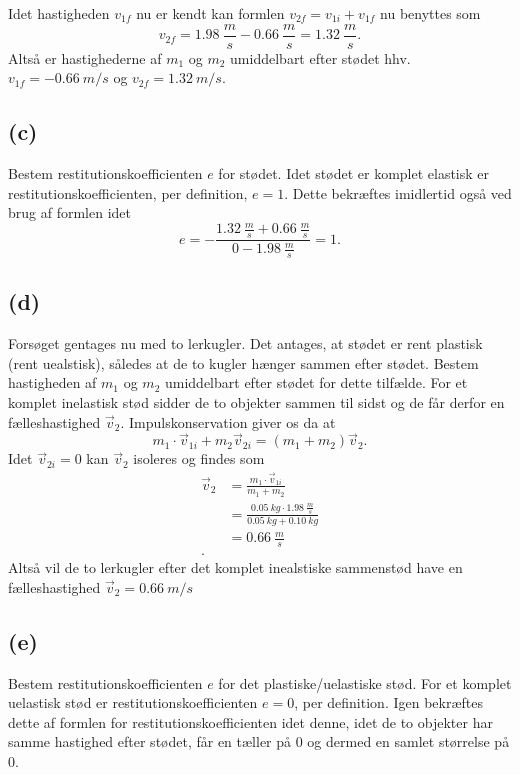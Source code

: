\documentclass[12pt]{article}
\theoremstyle{definition}
\begin{document}
Idet hastigheden $v_{1f}$ nu er kendt kan formlen $v_{2f} = v_{1i} + v_{1f}$ nu benyttes som
\[ 
v_{2f} = \qty{1,98}{\frac{m}{s}} - \qty{0,66}{\frac{m}{s}} =  \qty{1,32}{\frac{m}{s}} 
.\]
Altså er hastighederne af $m_1$ og $m_2$ umiddelbart efter stødet hhv. $v_{1f} = - \qty{0,66}{m \per s}$ og $v_{2f} = \qty{1,32}{m \per s}$.


\subsection*{(c)}
Bestem restitutionskoefficienten $e$ for stødet.
\bigbreak
Idet stødet er komplet elastisk er restitutionskoefficienten, per definition, $e = 1$. Dette bekræftes imidlertid også ved brug af formlen idet
\[ 
  e = - \frac{\qty{1,32}{\frac{m}{s}} + \qty{0,66}{\frac{m}{s}}}{0 - \qty{1,98}{\frac{m}{s}}} = 1
.\]


\subsection*{(d)}
Forsøget gentages nu med to lerkugler. Det antages, at stødet er rent plastisk (rent uealstisk), således at de to kugler hænger sammen efter stødet. Bestem hastigheden af $m_1$ og $m_2$ umiddelbart efter stødet for dette tilfælde.
\bigbreak
For et komplet inelastisk stød sidder de to objekter sammen til sidst og de får derfor en fælleshastighed $\Vec{v}_2$. Impulskonservation giver os da at
\[ 
m_1 \cdot \Vec{v}_{1i} + m_2 \Vec{v}_{2i} = (m_1 + m_2)\Vec{v}_{2}
.\]
Idet $\Vec{v}_{2i} = 0$ kan $\Vec{v}_2$ isoleres og findes som
\begin{align*}
  \Vec{v}_2 &= \frac{m_1 \cdot \Vec{v}_{1i}}{m_1 + m_2} \\
  &= \frac{\qty{0,05}{kg} \cdot \qty{1,98}{\frac{m}{s}}}{\qty{0,05}{kg} + \qty{0,10}{kg}} \\
  &= \qty{0,66}{\frac{m}{s}}  \\
.\end{align*}
Altså vil de to lerkugler efter det komplet inealstiske sammenstød have en fælleshastighed $\Vec{v}_2 = \qty{0,66}{m\per s}$


\subsection*{(e)}
Bestem restitutionskoefficienten $e$ for det plastiske/uelastiske stød.
\bigbreak
For et komplet uelastisk stød er restitutionskoefficienten $e = 0$, per definition. Igen bekræftes dette af formlen for restitutionskoefficienten idet denne, idet de to objekter har samme hastighed efter stødet, får en tæller på 0 og dermed en samlet størrelse på 0. 
\end{document}
